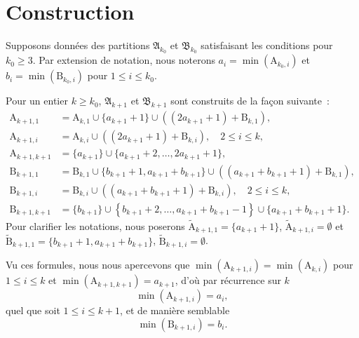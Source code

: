 \documentclass[11pt, oneside]{article}   	%
\newcommand{\interval}[2]{\left\{ #1, \dots, #2 \right\}}
\begin{document}
\section{Construction}

Supposons données des partitions $\mathfrak{A}_{k_0}$ et $\mathfrak{B}_{k_0}$ satisfaisant les conditions pour $k_0 \geqslant 3$.
Par extension de notation, nous noterons $a_i = \min(\mathrm{A}_{k_0, i})$ et $b_i = \min(\mathrm{B}_{k_0, i})$ pour $1 \leqslant i \leqslant k_0$.

Pour un entier $k \geqslant k_0$, $\mathfrak{A}_{k + 1}$ et $\mathfrak{B}_{k + 1}$ sont construits de la façon suivante~:
\begin{align}
  \mathrm{A}_{k + 1, 1} &= \mathrm{A}_{k, 1} \cup \{a_{k+1} + 1\} \cup \left( (2 a_{k+1} + 1) + \mathrm{B}_{k, 1} \right), \\
  \mathrm{A}_{k + 1, i} &= \mathrm{A}_{k, i} \cup \left( (2 a_{k+1} + 1) + \mathrm{B}_{k, i} \right), \quad 2 \leqslant i \leqslant k, \\
  \mathrm{A}_{k + 1, k + 1} &= \{ a_{k + 1} \} \cup \{ a_{k+1} + 2, \dots, 2 a_{k+1} + 1\}, \\
  \mathrm{B}_{k + 1, 1} &= \mathrm{B}_{k, 1} \cup \{ b_{k+1} + 1, a_{k+1} + b_{k+1}\} \cup \left( (a_{k+1} + b_{k+1} + 1) + \mathrm{B}_{k, 1} \right), \\
  \mathrm{B}_{k + 1, i} &= \mathrm{B}_{k, i} \cup \left( (a_{k+1} + b_{k+1} + 1) + \mathrm{B}_{k, i} \right), \quad 2 \leqslant i \leqslant k, \\
  \mathrm{B}_{k + 1, k + 1} &= \{b_{k + 1}\} \cup \interval{b_{k + 1} + 2}{a_{k+1} + b_{k+1} - 1} \cup \{a_{k+1} + b_{k+1} + 1\}.
\end{align}
Pour clarifier les notations, nous poserons $\tilde{\mathrm{A}}_{k+1, 1} = \{a_{k+1} + 1\}$, $\tilde{\mathrm{A}}_{k+1, i} = \emptyset$
et $\tilde{\mathrm{B}}_{k+1, 1} = \{b_{k+1} + 1, a_{k+1} + b_{k+1}\}$, $\tilde{\mathrm{B}}_{k+1, i} = \emptyset$.

Vu ces formules, nous nous apercevons que $\min(\mathrm{A}_{k + 1, i}) = \min(\mathrm{A}_{k, i})$ pour $1 \leqslant i \leqslant k$
et $\min(\mathrm{A}_{k + 1, k + 1}) = a_{k + 1}$, d'où par récurrence sur $k$
\begin{equation}
 \min(\mathrm{A}_{k + 1, i}) = a_i,
\end{equation}
quel que soit $1 \leqslant i \leqslant k + 1$, et de manière semblable
\begin{equation}
 \min(\mathrm{B}_{k + 1, i}) = b_i.
\end{equation}
\end{document}
